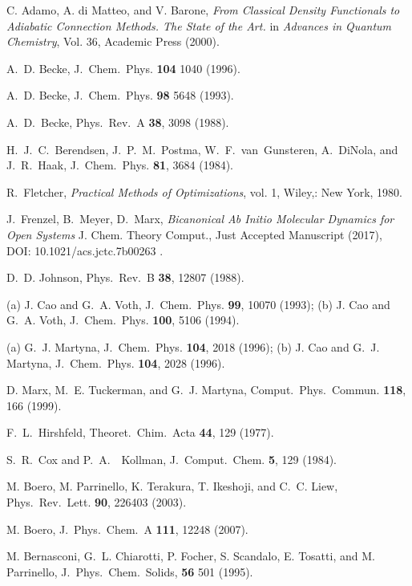 \documentclass[twoside,10pt,titlepage,a4paper]{article}
\begin{document}
\begin{thebibliography}{999}
    C. Adamo, A. di Matteo, and V. Barone, {\it From Classical Density
    Functionals to Adiabatic Connection Methods. The State of the
    Art.} in {\em Advances in Quantum Chemistry}, Vol. 36, Academic Press
    (2000).

    A.~D. Becke, J.~Chem.~Phys. {\bf 104} 1040 (1996).

    A.~D. Becke, J.~Chem.~Phys. {\bf 98} 5648 (1993).

    A.~D.~Becke,
    Phys.~Rev.~A {\bf 38}, 3098 (1988).

    H.~J.~C.~Berendsen, J.~P.~M.~Postma, W.~F.~van~Gunsteren, 
    A.~DiNola, and J.~R.~Haak,
    J.~Chem.~Phys. {\bf 81}, 3684 (1984).

    R.~Fletcher,
    {\em Practical Methods of Optimizations}, vol. 1, 
    Wiley,: New York, 1980.

    J.~Frenzel, B.~Meyer, D.~Marx, 
    {\em Bicanonical Ab Initio Molecular Dynamics for Open Systems}
    J. Chem. Theory Comput., Just Accepted Manuscript 
    (2017), 
    DOI: 10.1021/acs.jctc.7b00263 .

    D.~D. Johnson, Phys.~Rev.~B {\bf 38}, 12807 (1988).

  (a) J. Cao and G.~A. Voth,
    J.~Chem.~Phys. {\bf 99}, 10070 (1993);
  (b) J. Cao and G.~A. Voth,
    J.~Chem.~Phys. {\bf 100}, 5106 (1994).

  (a) G.~J. Martyna,
    J.~Chem.~Phys. {\bf 104}, 2018 (1996);
  (b) J. Cao and G.~J. Martyna,
    J.~Chem.~Phys. {\bf 104}, 2028 (1996).

    D. Marx, M.~E. Tuckerman, and G.~J. Martyna,
    Comput.~Phys.~Commun. {\bf 118}, 166 (1999).

    F.~L.~Hirshfeld,
    Theoret.~Chim.~Acta {\bf 44}, 129 (1977).

    S.~R.~Cox and P.~A.~~Kollman,
    J.~Comput.~Chem. {\bf 5}, 129 (1984).

 M. Boero, M. Parrinello, K. Terakura, T. Ikeshoji, and C.~C. Liew,
     Phys.~Rev.~Lett. {\bf 90}, 226403 (2003).

 M. Boero, J.~Phys.~Chem.~A {\bf 111}, 12248 (2007).

    M. Bernasconi, G.~L. Chiarotti, P. Focher, S. Scandalo, E. Tosatti,
    and M. Parrinello, J.~Phys.~Chem.~Solids, {\bf 56} 501 (1995).


\end{thebibliography}
\end{document}
